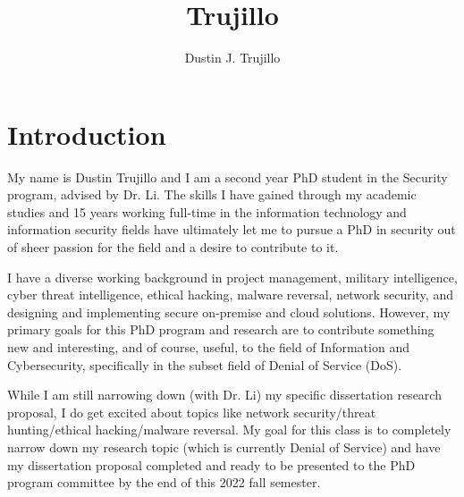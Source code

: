 



\title{Trujillo}
\author{Dustin J. Trujillo}

% 
\maketitle


\section{Introduction}

My name is Dustin Trujillo and I am a second year PhD student in the Security program, advised by Dr. Li. The skills I have gained through my academic studies and 15 years working full-time in the information technology and information security fields have ultimately let me to pursue a PhD in security out of sheer passion for the field and a desire to contribute to it.

I have a diverse working background in project management, military intelligence, cyber threat intelligence, ethical hacking, malware reversal, network security, and designing and implementing secure on-premise and cloud solutions. However, my primary goals for this PhD program and research are to contribute something new and interesting, and of course, useful, to the field of Information and Cybersecurity, specifically in the subset field of Denial of Service (DoS).

While I am still narrowing down (with Dr. Li) my specific dissertation research proposal, I do get excited about topics like network security/threat hunting/ethical hacking/malware reversal. My goal for this class is to completely narrow down my research topic (which is currently Denial of Service) and have my dissertation proposal completed and ready to be presented to the PhD program committee by the end of this 2022 fall semester.

